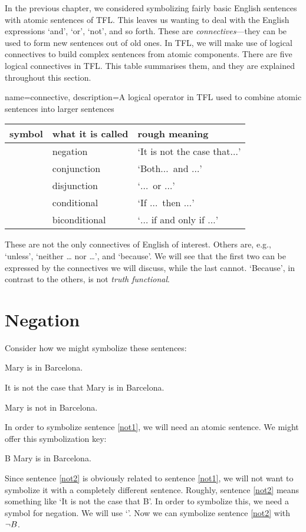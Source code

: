 In the previous chapter, we considered symbolizing fairly basic English sentences with atomic sentences of TFL. This leaves us wanting to deal with the English expressions `and', `or', `not', and so forth. These are \emph{connectives}---they can be used to form new sentences out of old ones. In TFL, we will make use of logical connectives to build complex sentences from atomic components. There are five logical connectives in TFL. This table summarises them, and they are explained throughout this section.

{
name=connective,
description={A logical operator in TFL used to combine \glspl{atomic sentence} into larger sentences}
}
	\begin{table}[h]
	\center
	\begin{tabular}{l l l}
	
	\textbf{symbol}&\textbf{what it is called}&\textbf{rough meaning}\\
	\hline
	\enot&negation&`It is not the case that$\ldots$'\\
	\eand&conjunction&`Both$\ldots$\ and $\ldots$'\\
	\eor&disjunction&`$\ldots$\ or $\ldots$'\\
	\eif&conditional&`If $\ldots$\ then $\ldots$'\\
	\eiff&biconditional&`$\ldots$ if and only if $\ldots$'\\
	
	\end{tabular}
	\end{table}

These are not the only connectives of English of interest. Others are, e.g., `unless', `neither \dots{} nor \dots', and `because'. We will see that the first two can be expressed by the connectives we will discuss, while the last cannot. `Because', in contrast to the others, is not \emph{truth functional}.

        
\section{Negation}

Consider how we might symbolize these sentences:
	\begin{earg}
	\item[\ex{not1}] Mary is in Barcelona.
	\item[\ex{not2}] It is not the case that Mary is in Barcelona.
	\item[\ex{not3}] Mary is not in Barcelona.
	\end{earg}
In order to symbolize sentence \ref{not1}, we will need an atomic sentence. We might offer this symbolization key:
	\begin{ekey}
		\item[B] Mary is in Barcelona.
	\end{ekey}
Since sentence \ref{not2} is obviously related to  sentence \ref{not1}, we will not want to symbolize it with a completely different sentence. Roughly, sentence \ref{not2} means something like `It is not the case that B'. In order to symbolize this, we need a symbol for negation. We will use `\enot'. Now we can symbolize sentence \ref{not2} with $\neg B$.

